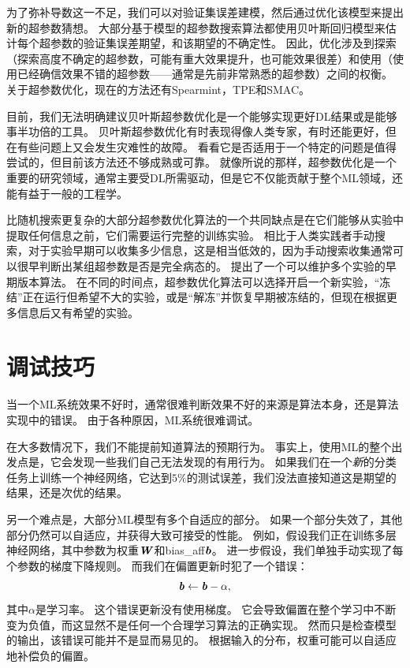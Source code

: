为了弥补导数这一不足，我们可以对验证集误差建模，然后通过优化该模型来提出新的超参数猜想。
大部分基于模型的超参数搜索算法都使用贝叶斯回归模型来估计每个超参数的验证集误差期望，和该期望的不确定性。
因此，优化涉及到探索（探索高度不确定的超参数，可能有重大效果提升，也可能效果很差）和使用（使用已经确信效果不错的超参数——通常是先前非常熟悉的超参数）之间的权衡。
关于超参数优化，现在的方法还有Spearmint\citep{Snoek+al-NIPS2012-small}，TPE\citep{Bergstra+al-NIPS2011}和SMAC\citep{hutter+hoos+leyton+brown:2011}。

目前，我们无法明确建议贝叶斯超参数优化是一个能够实现更好\gls{DL}结果或是能够事半功倍的工具。
贝叶斯超参数优化有时表现得像人类专家，有时还能更好，但在有些问题上又会发生灾难性的故障。
看看它是否适用于一个特定的问题是值得尝试的，但目前该方法还不够成熟或可靠。
就像所说的那样，超参数优化是一个重要的研究领域，通常主要受\gls{DL}所需驱动，但是它不仅能贡献于整个\gls{ML}领域，还能有益于一般的工程学。


比随机搜索更复杂的大部分超参数优化算法的一个共同缺点是在它们能够从实验中提取任何信息之前，它们需要运行完整的训练实验。
相比于人类实践者手动搜索，对于实验早期可以收集多少信息，这是相当低效的，因为手动搜索收集通常可以很早判断出某组超参数是否是完全病态的。
\cite{swersky2014freeze}提出了一个可以维护多个实验的早期版本算法。
在不同的时间点，超参数优化算法可以选择开启一个新实验，``冻结''正在运行但希望不大的实验，或是``解冻''并恢复早期被冻结的，但现在根据更多信息后又有希望的实验。

\section{调试技巧}
\label{sec:debugging_strategies}
当一个\gls{ML}系统效果不好时，通常很难判断效果不好的来源是算法本身，还是算法实现中的错误。
由于各种原因，\gls{ML}系统很难调试。

在大多数情况下，我们不能提前知道算法的预期行为。
事实上，使用\gls{ML}的整个出发点是，它会发现一些我们自己无法发现的有用行为。
如果我们在一个\emph{新}的分类任务上训练一个神经网络，它达到$5\%$的测试误差，我们没法直接知道这是期望的结果，还是次优的结果。

另一个难点是，大部分\gls{ML}模型有多个自适应的部分。
如果一个部分失效了，其他部分仍然可以自适应，并获得大致可接受的性能。
例如，假设我们正在训练多层神经网络，其中参数为权重$\boldsymbol{\mathit{W}}$和\gls{bias_aff}$\boldsymbol{\mathit{b}}$。
进一步假设，我们单独手动实现了每个参数的梯度下降规则。
而我们在偏置更新时犯了一个错误：
\begin{equation}
	\boldsymbol{\mathit{b}} \leftarrow \boldsymbol{\mathit{b}} - \alpha,
\end{equation}
其中$\alpha$是学习率。
这个错误更新没有使用梯度。
它会导致偏置在整个学习中不断变为负值，而这显然不是任何一个合理学习算法的正确实现。
然而只是检查模型的输出，该错误可能并不是显而易见的。
根据输入的分布，权重可能可以自适应地补偿负的偏置。

